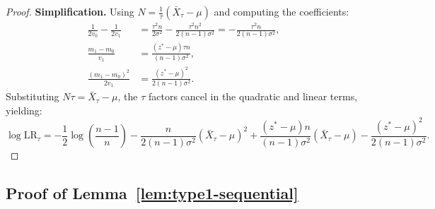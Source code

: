 \documentclass{article}
\theoremstyle{plain}
\theoremstyle{definition}
\theoremstyle{remark}
\begin{document}
\begin{proof}
    \textbf{Simplification.}
    Using $N = \frac{1}{\tau}(\bar{X}_\tau - \mu)$ and computing the coefficients:
    \begin{align*}
        \frac{1}{2v_0} - \frac{1}{2v_1} & = \frac{\tau^2 n}{2\sigma^2} - \frac{\tau^2 n^2}{2(n-1)\sigma^2} = -\frac{\tau^2 n}{2(n-1)\sigma^2}, \\
        \frac{m_1-m_0}{v_1}             & = \frac{(z^* - \mu)\tau n}{(n-1)\sigma^2},                                                           \\
        \frac{(m_1-m_0)^2}{2v_1}        & = \frac{(z^* - \mu)^2}{2(n-1)\sigma^2}.
    \end{align*}
    Substituting $N\tau = \bar{X}_\tau - \mu$, the $\tau$ factors cancel in the quadratic and linear terms, yielding:
    \begin{equation*}
        \log \mathrm{LR}_\tau = -\frac{1}{2}\log\left(\frac{n-1}{n}\right) - \frac{n}{2(n-1)\sigma^2}(\bar{X}_\tau - \mu)^2 + \frac{(z^* - \mu)n}{(n-1)\sigma^2}(\bar{X}_\tau - \mu) - \frac{(z^* - \mu)^2}{2(n-1)\sigma^2}.
    \end{equation*}
\end{proof}

\subsection{Proof of Lemma~\ref{lem:type1-sequential}}
\label{app:proof-type1-sequential}

\typeisequential*
\end{document}
